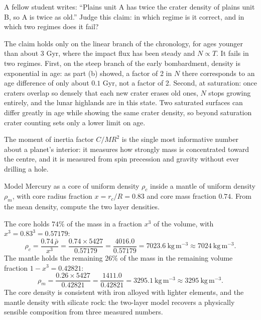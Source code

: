 \parti A fellow student writes: ``Plains unit A has twice the crater density of plains unit B, so A is twice as old.''
Judge this claim: in which regime is it correct, and in which two regimes does it fail?

\begin{solution}
The claim holds only on the linear branch of the chronology, for ages younger than about $3$ Gyr,
where the impact flux has been steady and $N \propto T$.
It fails in two regimes.
First, on the steep branch of the early bombardment, density is exponential in age:
as part (b) showed, a factor of 2 in $N$ there corresponds to an age difference of only about $0.1$ Gyr, not a factor of 2.
Second, at saturation: once craters overlap so densely that each new crater erases old ones,
$N$ stops growing entirely, and the lunar highlands are in this state.
Two saturated surfaces can differ greatly in age while showing the same crater density,
so beyond saturation crater counting sets only a lower limit on age.
\end{solution}



The moment of inertia factor $C/MR^2$ is the single most informative number about a planet's interior:
it measures how strongly mass is concentrated toward the centre,
and it is measured from spin precession and gravity without ever drilling a hole.

\parti Model Mercury as a core of uniform density $\rho_c$ inside a mantle of uniform density $\rho_m$,
with core radius fraction $x = r_c/R = 0.83$ and core mass fraction $0.74$.
From the mean density, compute the two layer densities.

\begin{solution}
The core holds $74\%$ of the mass in a fraction $x^3$ of the volume, with $x^3 = 0.83^3 = 0.57179$:
\[
\rho_c = \frac{0.74\,\bar\rho}{x^3} = \frac{0.74 \times 5427}{0.57179} = \frac{4016.0}{0.57179} = 7023.6\ \mathrm{kg\,m^{-3}} \approx 7024\ \mathrm{kg\,m^{-3}}.
\]
The mantle holds the remaining $26\%$ of the mass in the remaining volume fraction $1 - x^3 = 0.42821$:
\[
\rho_m = \frac{0.26 \times 5427}{0.42821} = \frac{1411.0}{0.42821} = 3295.1\ \mathrm{kg\,m^{-3}} \approx 3295\ \mathrm{kg\,m^{-3}}.
\]
The core density is consistent with iron alloyed with lighter elements, and the mantle density with silicate rock:
the two-layer model recovers a physically sensible composition from three measured numbers.
\end{solution}

